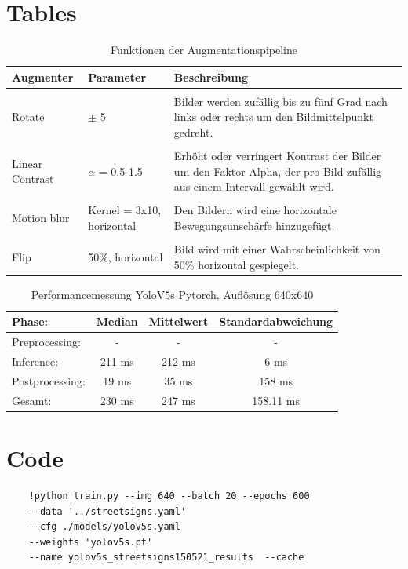 \section{Tables}
\begin{table}[H]
	\centering
	\begin{tabular}[H]{llp{5cm}}
		Augmenter & Parameter & Beschreibung \\ \hline
		& & \\
		Rotate &  $\pm$ 5\textdegree & Bilder werden zufällig bis zu fünf Grad nach links oder rechts um den Bildmittelpunkt gedreht.\\
		& & \\
		Linear Contrast & $\alpha$ = 0.5-1.5  & Erhöht oder verringert Kontrast der Bilder um den Faktor Alpha, der pro Bild zufällig aus einem Intervall gewählt wird.\\
		& & \\
		Motion blur & Kernel = 3x10, horizontal & Den Bildern wird eine horizontale Bewegungsunschärfe hinzugefügt.\\
		& & \\
		Flip & 50\%, horizontal & Bild wird mit einer Wahrscheinlichkeit von 50\% horizontal gespiegelt.\\
		
	\end{tabular}
	\caption{Funktionen der Augmentationspipeline}
	\label{tab:imgaugmenters}
\end{table}


\begin{table}[H]
	\centering	\begin{tabularx}{\textwidth}{|X|c|c|c|}
		\hline
		Phase:  & Median & Mittelwert & Standardabweichung \\ \hline
		Preprocessing: &  - &  - & - \\ \hline
		Inference: &  211 ms & 212 ms & 6 ms \\ \hline
		Postprocessing: &  19 ms & 35 ms & 158 ms \\ \hline
		Gesamt: & 230 ms & 247 ms & 158.11 ms \\ \hline
	\end{tabularx}
	\caption{Performancemessung YoloV5s Pytorch, Auflösung 640x640}
	\label{tab:performYoloV5PT_640}
\end{table}


\section{Code}

\begin{lstlisting}[caption=Training starten]
	%cd /home/$user/yolov5
	!python train.py --img 640 --batch 20 --epochs 600
	--data '../streetsigns.yaml'
	--cfg ./models/yolov5s.yaml
	--weights 'yolov5s.pt'
	--name yolov5s_streetsigns150521_results  --cache
\end{lstlisting}

